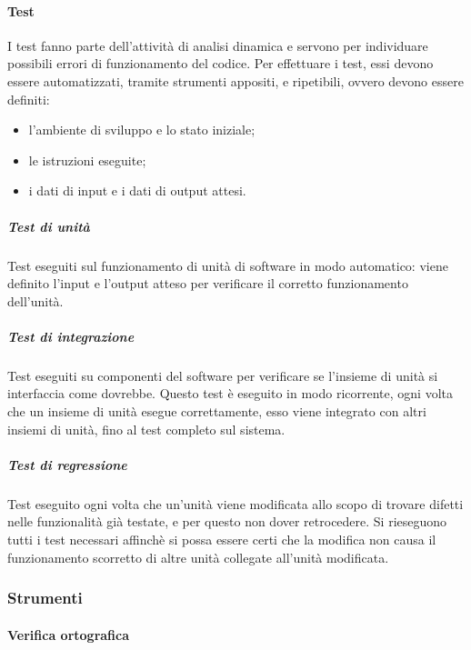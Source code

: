         \paragraph{Test}
			I test fanno parte dell'attività di analisi dinamica e servono per individuare possibili errori di funzionamento del codice. Per effettuare i test, essi devono essere automatizzati, tramite strumenti appositi, e ripetibili, ovvero devono essere definiti:
			\begin{itemize}
				\item l'ambiente di sviluppo e lo stato iniziale;
				\item le istruzioni eseguite;
				\item i dati di input e i dati di output attesi.
			\end{itemize}
            \subparagraph*{Test di unità}
				Test eseguiti sul funzionamento di unità di software in modo automatico: viene definito l'input e l'output atteso per verificare il corretto funzionamento dell'unità.
            \subparagraph*{Test di integrazione}
				Test eseguiti su componenti del software per verificare se l'insieme di unità si interfaccia come dovrebbe. Questo test è eseguito in modo ricorrente, ogni volta che un insieme di unità esegue correttamente, esso viene integrato con altri insiemi di unità, fino al test completo sul sistema.
            \subparagraph*{Test di regressione}
				Test eseguito ogni volta che un'unità viene modificata allo scopo di trovare difetti nelle funzionalità già testate, e per questo non dover retrocedere. Si rieseguono tutti i test necessari affinchè si possa essere certi che la modifica non causa il funzionamento scorretto di altre unità collegate all'unità modificata.

    \subsubsection{Strumenti}
        \paragraph{Verifica ortografica}